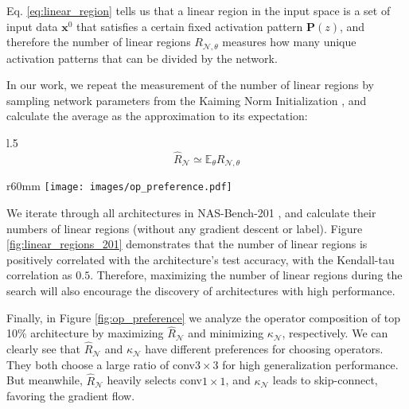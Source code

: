 \documentclass{article} \usepackage{iclr2021_conference,times}
\def\mP{{\bm{P}}}
\begin{document}
\vspace{-2em}
Eq. \ref{eq:linear_region} tells us that a linear region in the input space is a set of input data $\bm{x}^0$ that satisfies a certain fixed activation pattern $\mP(z)$, and therefore the number of linear regions $R_{\mathcal{N},\theta}$ measures how many unique activation patterns that can be divided by the network.

In our work, we repeat the measurement of the number of linear regions by sampling network parameters from the Kaiming Norm Initialization \citep{he2015delving}, and calculate the average as the approximation to its expectation:
\begin{wrapfigure}{l}{.5\textwidth}
\begin{equation}
    \hat{R}_\mathcal{N} \simeq \mathbb{E}_{\theta} R_{\mathcal{N},\theta}
\end{equation}
\end{wrapfigure}

\begin{wrapfigure}{r}{60mm}
\vspace{-1em}
\texttt{[image: images/op\_preference.pdf]}
\centering \vspace{-1em}
\caption{$\kappa_\mathcal{N}$ and $\hat{R}_\mathcal{N}$ prefer different operators in NAS-Bench201.}
\label{fig:op_preference}
\vspace{-2em}
\end{wrapfigure}

\vspace{-0.5em}

We iterate through all architectures in NAS-Bench-201 \citep{dong2020bench}, and calculate their numbers of linear regions (without any gradient descent or label). Figure \ref{fig:linear_regions_201} demonstrates that the number of linear regions is positively correlated with the architecture's test accuracy, with the Kendall-tau correlation as $0.5$. Therefore, maximizing the number of linear regions during the search will also encourage the discovery of architectures with high performance.

Finally, in Figure \ref{fig:op_preference} we analyze the operator composition of top 10\% architecture by maximizing $\hat{R}_\mathcal{N}$ and minimizing $\kappa_\mathcal{N}$, respectively. We can clearly see that $\hat{R}_\mathcal{N}$ and $\kappa_\mathcal{N}$ have different preferences for choosing operators. They both choose a large ratio of conv$3\times3$ for high generalization performance. But meanwhile, $\hat{R}_\mathcal{N}$ heavily selects conv$1\times1$, and $\kappa_\mathcal{N}$ leads to skip-connect, favoring the gradient flow.
\end{document}
